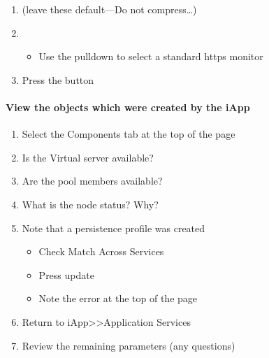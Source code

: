 \documentclass[letterpaper,10pt,english]{sphinxmanual}
\begin{document}
\begin{enumerate}
\item {} 
 (leave these default—Do not compress…)

\item {} 
\begin{itemize}
\item {} 
Use the pulldown to select a standard https monitor

\end{itemize}

\item {} 
Press the  button

\end{enumerate}


\paragraph{View the objects which were created by the iApp}
\label{\detokenize{class2/module1/lab1:view-the-objects-which-were-created-by-the-iapp}}\begin{enumerate}
\item {} 
Select the Components tab at the top of the page


\item {} 
Is the Virtual server available?

\item {} 
Are the pool members available?

\item {} 
What is the node status? Why?

\item {} 
Note that a persistence profile was created
\begin{itemize}
\item {} 
Check Match Across Services

\item {} 
Press update

\item {} 
Note the error at the top of the page

\end{itemize}

\item {} 
Return to iApp\textgreater{}\textgreater{}Application Services

\item {} 
Review the remaining parameters (any questions)

\end{enumerate}
\end{document}
